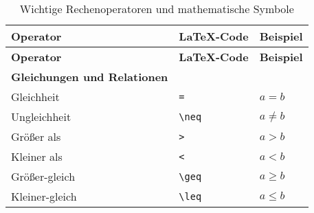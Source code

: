 \begin{table}[H]
    \centering
    \renewcommand{\arraystretch}{1.3}
    \begin{longtable}{>{\raggedright}p{4cm} >{\raggedright}p{6cm} >{\raggedright}p{5cm}}
        \caption{Wichtige Rechenoperatoren und mathematische Symbole}
        \toprule
        \textbf{Operator}                                    & \textbf{LaTeX-Code}                                                                     & \textbf{Beispiel}                    \\
        \hline
        \endfirsthead
        \toprule
        \textbf{Operator}                                    & \textbf{LaTeX-Code}                                                                     & \textbf{Beispiel}                    \\
        \midrule
        \endhead

        \bottomrule
        \hline
        \endfoot
        \textbf{Gleichungen und Relationen}                  &                                                                                         &                                      \\
        Gleichheit                                           & \texttt{=}                                                                              & $ a = b $                            \\
        Ungleichheit                                         & \texttt{\textbackslash neq}                                                             & $ a \neq b $                         \\
        Größer als                                           & \texttt{>}                                                                              & $ a > b $                            \\
        Kleiner als                                          & \texttt{<}                                                                              & $ a < b $                            \\
        Größer-gleich                                        & \texttt{\textbackslash geq}                                                             & $ a \geq b $                         \\
        Kleiner-gleich                                       & \texttt{\textbackslash leq}                                                             & $ a \leq b $                         \\


\end{longtable}
\end{table}
